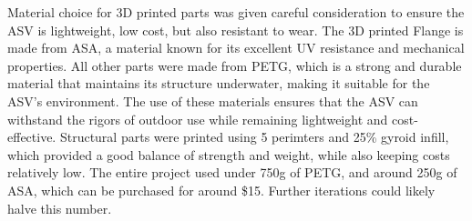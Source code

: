 Material choice for 3D printed parts was given careful consideration to ensure the ASV is lightweight, low cost, but also resistant to wear. The 3D printed Flange is made from ASA, a material known for its excellent UV resistance and mechanical properties. All other parts were made from PETG, which is a strong and durable material that maintains its structure underwater, making it suitable for the ASV's environment. The use of these materials ensures that the ASV can withstand the rigors of outdoor use while remaining lightweight and cost-effective. Structural parts were printed using 5 perimters and 25\% gyroid infill, which provided a good balance of strength and weight, while also keeping costs relatively low. The entire project used under 750g of PETG, and around 250g of ASA, which can be purchased for around \$15. Further iterations could likely halve this number.